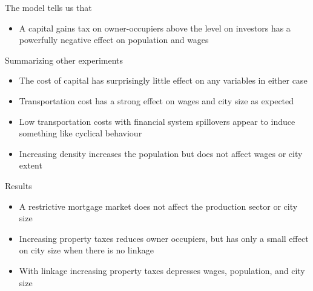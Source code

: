 \documentclass[hide notes=show/only]{beamer} %
\begin{document}
\begin{frame}{The model tells us that}  \Large
\begin {itemize}[<+-|alert@+>]
\item  A capital gains tax on owner-occupiers above the level  on investors has a powerfully negative effect on population and wages
\end{itemize}
\end{frame}

\begin{frame}{Summarizing other experiments} \Large
\begin {itemize}[<+-|alert@+>]

\item  The cost of capital has surprisingly little effect on any variables in either case

\item  Transportation cost has a strong effect on wages and city size as expected 
 
\item Low transportation costs with financial system spillovers appear to induce something like cyclical behaviour

\item  Increasing density increases the population but does not affect wages or city extent
\end{itemize}
\end{frame}%

\begin{frame}{Results} \Large
\begin {itemize}[<+-|alert@+>]
\item A restrictive mortgage market does not affect the production sector or city size

\item  Increasing property taxes reduces owner occupiers, but has only a small effect on city size when there is no linkage 
 
\item  With linkage increasing property taxes depresses wages, population, and city size
\end{itemize}
\end{frame}%
\end{document}
